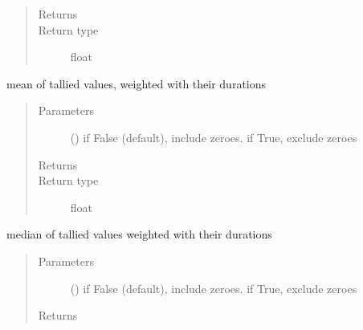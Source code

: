 \documentclass[letterpaper,10pt,english]{sphinxmanual}
\begin{document}
\begin{fulllineitems}
\begin{fulllineitems}
\begin{quote}
\begin{description}
\item[{Returns}] \leavevmode
{}

\item[{Return type}] \leavevmode
float

\end{description}\end{quote}

\end{fulllineitems}


\begin{fulllineitems}
\label{\detokenize{Reference:salabim.MonitorTimestamp.mean}}
mean of tallied values, weighted with their durations
\begin{quote}\begin{description}
\item[{Parameters}] \leavevmode
{} () \textendash{} if False (default), include zeroes. if True, exclude zeroes

\item[{Returns}] \leavevmode
{}

\item[{Return type}] \leavevmode
float

\end{description}\end{quote}

\end{fulllineitems}


\begin{fulllineitems}
\label{\detokenize{Reference:salabim.MonitorTimestamp.median}}
median of tallied values weighted with their durations
\begin{quote}\begin{description}
\item[{Parameters}] \leavevmode
{} () \textendash{} if False (default), include zeroes. if True, exclude zeroes

\item[{Returns}] \leavevmode
{}


\end{description}
\end{quote}
\end{fulllineitems}
\end{fulllineitems}
\end{document}
